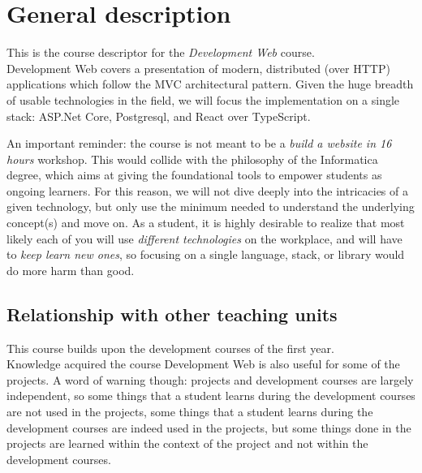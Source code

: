 \section{General description}
	This is the course descriptor for the \emph{Development Web} course.
\\
Development Web covers a presentation of modern, distributed (over HTTP)
applications which follow the MVC architectural pattern. Given the huge
breadth of usable technologies in the field, we will focus the
implementation on a single stack: ASP.Net Core, Postgresql, and React
over TypeScript.

An important reminder: the course is not meant to be a \emph{build a
website in 16 hours} workshop. This would collide with the philosophy of
the Informatica degree, which aims at giving the foundational tools to
empower students as ongoing learners. For this reason, we will not dive
deeply into the intricacies of a given technology, but only use the
minimum needed to understand the underlying concept(s) and move on. As a
student, it is highly desirable to realize that most likely each of you
will use \emph{different technologies} on the workplace, and will have
to \emph{keep learn new ones}, so focusing on a single language, stack,
or library would do more harm than good.

	\subsection{Relationship with other teaching units}
		This course builds upon the development courses of the first year.	\\		
		Knowledge acquired the course Development Web is also useful for some of the projects. A word of warning though: projects and development courses are largely independent, so some things that a student learns during the development courses are not used in the projects, some things that a student learns during the development courses are indeed used in the projects, but some things done in the projects are learned within the context of the project and not within the development courses.
